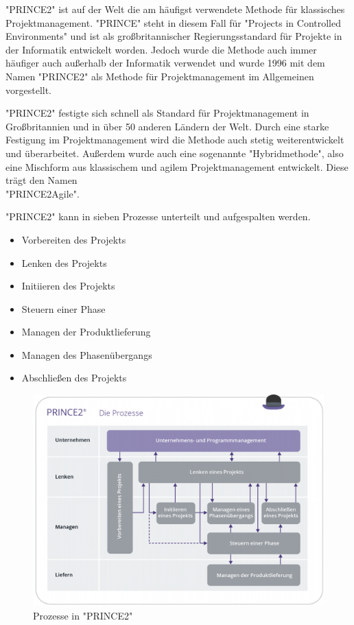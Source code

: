 

"PRINCE2" ist auf der Welt die am häufigst verwendete Methode für klassisches Projektmanagement. "PRINCE" steht in diesem Fall für "Projects in Controlled Environments" und ist als großbritannischer Regierungsstandard für Projekte in der Informatik entwickelt worden. Jedoch wurde die Methode auch immer häufiger auch außerhalb der Informatik verwendet und wurde 1996 mit dem Namen "PRINCE2" als Methode für Projektmanagement im Allgemeinen vorgestellt. \cite{Projectman.}

"PRINCE2" festigte sich schnell als Standard für Projektmanagement in Großbritannien und in über 50 anderen Ländern der Welt. Durch eine starke Festigung im Projektmanagement wird die Methode auch stetig weiterentwickelt und überarbeitet. Außerdem wurde auch eine sogenannte "Hybridmethode", also eine Mischform aus klassischem und agilem Projektmanagement entwickelt. Diese trägt den Namen\\ "PRINCE2Agile". \cite{Projectman.}

\pagebreak


"PRINCE2" kann in sieben Prozesse unterteilt und aufgespalten werden.

\begin{itemize}
    \item Vorbereiten des Projekts
    \item Lenken des Projekts
    \item Initiieren des Projekts
    \item Steuern einer Phase
    \item Managen der Produktlieferung
    \item Managen des Phasenübergangs
    \item Abschließen des Projekts
\end{itemize}

\cite{Prince2}

\begin{figure}[H]
    \centering
    \includegraphics[width=\textwidth]{media/ProjectManagement/Prince2.png}
    \caption{Prozesse in "PRINCE2" \cite{Prince2}}
    \label{fig:prince}
\end{figure}

